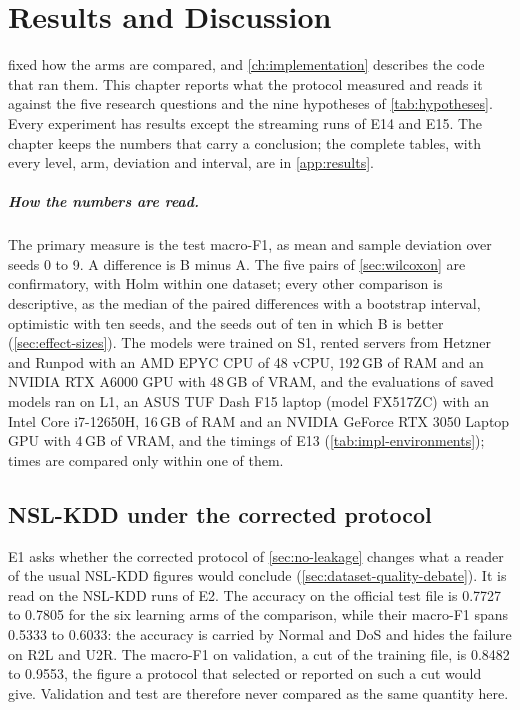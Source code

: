 \chapter{Results and Discussion}
\label{ch:results}

 fixed how the arms are compared, and
\cref{ch:implementation} describes the code that ran them. This chapter reports what the
protocol measured and reads it against the five research questions and the nine hypotheses of
\cref{tab:hypotheses}. Every experiment has results except the streaming runs of E14 and E15. The
chapter keeps the numbers that carry a conclusion; the complete tables, with every level, arm,
deviation and interval, are in \cref{app:results}.

\paragraph{How the numbers are read.}
The primary measure is the test macro-F1, as mean and sample deviation over seeds 0 to 9. A difference is B minus A. The
five pairs of \cref{sec:wilcoxon} are confirmatory, with Holm within one dataset; every other comparison is descriptive,
as the median of the paired differences with a bootstrap interval, optimistic with ten seeds, and the seeds out of ten in
which B is better (\cref{sec:effect-sizes}). The models were trained on S1, rented servers from Hetzner and Runpod with an AMD EPYC CPU of 48 vCPU, 192\,GB of RAM and an NVIDIA RTX A6000 GPU with 48\,GB of VRAM, and the evaluations of saved
models ran on L1, an ASUS TUF Dash F15 laptop (model FX517ZC) with an Intel Core i7-12650H, 16\,GB of RAM and an NVIDIA GeForce RTX 3050 Laptop GPU with 4\,GB of VRAM, and the timings of E13 (\cref{tab:impl-environments}); times are compared only within one of them.

\section{NSL-KDD under the corrected protocol}
\label{sec:res-e1}

E1 asks whether the corrected protocol of \cref{sec:no-leakage} changes what a reader of the usual NSL-KDD figures
would conclude (\cref{sec:dataset-quality-debate}). It is read on the NSL-KDD runs of E2. The accuracy on the official
test file is 0.7727 to 0.7805 for the six learning arms of the comparison, while their macro-F1 spans 0.5333 to 0.6033:
the accuracy is carried by Normal and DoS and hides the failure on R2L and U2R. The macro-F1 on validation, a cut of the
training file, is 0.8482 to 0.9553, the figure a protocol that selected or reported on such a cut would give.
Validation and test are therefore never compared as the same quantity here.

